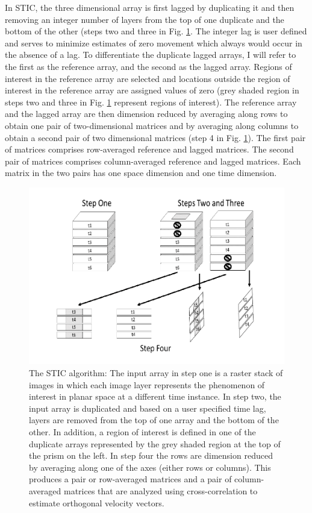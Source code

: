 In STIC, the three dimensional array is first lagged by duplicating it
and then removing an integer number of layers from the top of one
duplicate and the bottom of the other (steps two and three in Fig.
\ref{fig:1}. The integer lag is user defined and serves to minimize
estimates of zero movement which always would occur in the absence of a
lag. To differentiate the duplicate lagged arrays, I will refer to the
first as the reference array, and the second as the lagged array.
Regions of interest in the reference array are selected and locations
outside the region of interest in the reference array are assigned
values of zero (grey shaded region in steps two and three in Fig.
\ref{fig:1} represent regions of interest). The reference array and the
lagged array are then dimension reduced by averaging along rows to
obtain one pair of two-dimensional matrices and by averaging along
columns to obtain a second pair of two dimensional matrices (step 4 in
Fig. \ref{fig:1}). The first pair of matrices comprises row-averaged
reference and lagged matrices. The second pair of matrices comprises
column-averaged reference and lagged matrices. Each matrix in the two
pairs has one space dimension and one time dimension.

\begin{Schunk}
\begin{figure}
\includegraphics{ImageCorrelationVFv2_files/figure-latex/1-1} \caption[The STIC algorithm]{The STIC algorithm: The input array in step one is a raster stack of images in which each image layer represents the phenomenon of interest in planar space at a different time instance. In step two, the input array is duplicated and based on a user specified time lag, layers are removed from the top of one array and the bottom of the other. In addition, a region of interest is defined in one of the duplicate arrays represented by the grey shaded region at the top of the prism on the left. In step four the rows are dimension reduced by averaging along one of the axes (either rows or columns). This produces a pair or row-averaged matrices and a pair of column-averaged matrices that are analyzed using cross-correlation to estimate orthogonal velocity vectors.}\label{fig:1}
\end{figure}
\end{Schunk}

